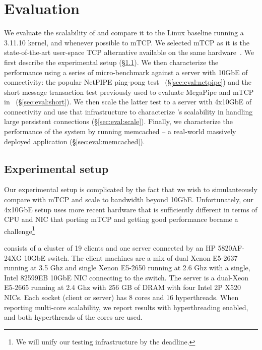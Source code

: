 
\section{Evaluation}
\label{sec:eval}

We evaluate the scalability of \ix and compare it to the Linux
baseline running a 3.11.10 kernel, and whenever possible to mTCP.  We
selected mTCP as it is the state-of-the-art user-space TCP alternative
available on the same hardware~\cite{jeong2014mtcp}.  We first
describe the experimental setup (\S\ref{sec:eval:setup}).  We then
characterize the performance using a series of micro-benchmark against
a server with 10GbE of connectivity: the popular NetPIPE ping-pong
test~\cite{snell1996netpipe} (\S\ref{sec:eval:netpipe}) and the short
message transaction test previously used to evaluate MegaPipe and mTCP
in~\cite{han2012megapipe,jeong2014mtcp} (\S\ref{sec:eval:short}).  We
then scale the latter test to a server with 4x10GbE of connectivity
and use that infrastructure to characterize \ix's scalability in handling large persistent connections
(\S\ref{sec:eval:scale}).  Finally, we characterize the performance of
the \ix system by running memcached -- a real-world massively deployed
application (\S\ref{sec:eval:memcached}).


\subsection{Experimental setup}
\label{sec:eval:setup}

Our experimental setup is complicated by the fact that we wish to
simulanteously compare with mTCP and scale to bandwidth beyond 10GbE.
Unfortunately, our 4x10GbE setup uses more recent hardware that is
sufficiently different in terms of CPU and NIC that porting mTCP and
getting good performance became a challenge\footnote{We will unify our testing infrastructure by the deadline.}

consists of a cluster of 19 clients and one
server connected by an HP 5820AF-24XG 10GbE switch.  The client
machines are a mix of dual Xenon E5-2637 running at 3.5 Ghz and single Xenon E5-2650 running at 2.6 Ghz with a single, Intel
82599EB 10GbE NIC connecting to the switch.  The server is a dual-Xeon E5-2665
running at 2.4 Ghz with 256 GB of DRAM with four Intel 2P X520 NICs.  Each
socket (client or server) has 8 cores and 16 hyperthreads.  When
reporting multi-core scalability, we report results with
hyperthreading enabled, and both hyperthreads of the cores are used.

